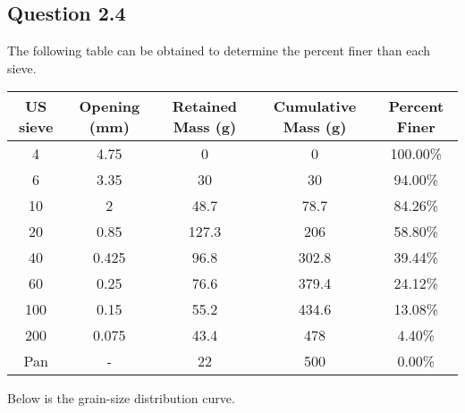 \documentclass{article}
\begin{document}
\subsection*{Question 2.4}
The following table can be obtained to determine the percent finer than each sieve.
\begin{center}
    \begin{tabular}{|ccccc|} 
        \hline
        \textbf{US sieve} & \textbf{Opening (mm)} & \textbf{Retained Mass (g)} & \textbf{Cumulative Mass (g)} & \textbf{Percent Finer}  \\ 
        \hline
        4                 & 4.75                  & 0                          & 0                            & 100.00\%                \\
        6                 & 3.35                  & 30                         & 30                           & 94.00\%                 \\
        10                & 2                     & 48.7                       & 78.7                         & 84.26\%                 \\
        20                & 0.85                  & 127.3                      & 206                          & 58.80\%                 \\
        40                & 0.425                 & 96.8                       & 302.8                        & 39.44\%                 \\
        60                & 0.25                  & 76.6                       & 379.4                        & 24.12\%                 \\
        100               & 0.15                  & 55.2                       & 434.6                        & 13.08\%                 \\
        200               & 0.075                 & 43.4                       & 478                          & 4.40\%                  \\
        Pan               & -                     & 22                         & 500                          & 0.00\%                  \\
        \hline
    \end{tabular}
\end{center}
Below is the grain-size distribution curve.
\begin{center}
    \pgfplotsset{width=10cm}
\end{center}
\end{document}
